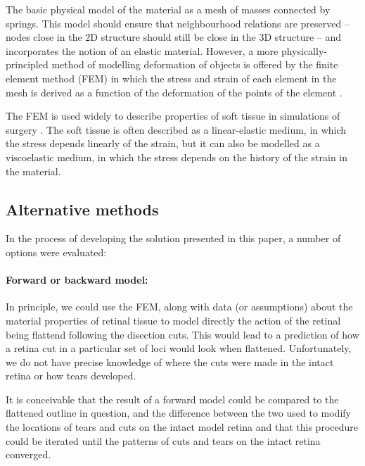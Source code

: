 \documentclass{article}
\begin{document}
The basic physical model of the material as a mesh of masses connected
by springs. This model should ensure that neighbourhood relations are
preserved -- nodes close in the 2D structure should still be close in
the 3D structure -- and incorporates the notion of an elastic
material. However, a more physically-principled method of modelling
deformation of objects is offered by the finite element method (FEM)
in which the stress and strain of each element in the mesh is derived
as a function of the deformation of the points of the element
\citep{ZienTayl00fini}.

The FEM is used widely to describe properties of soft tissue in
simulations of surgery \citep{CartEtal05appl}. The soft tissue is
often described as a linear-elastic medium, in which the stress
depends linearly of the strain, but it can also be modelled as a
viscoelastic medium, in which the stress depends on the history of the
strain in the material. 


\subsection{Alternative methods}
\label{fold-sphere:sec:alternative-methods}

In the process of developing the solution presented in this paper, a
number of options were evaluated:

\paragraph{Forward or backward model:} 

In principle, we could use the FEM, along with data (or assumptions)
about the material properties of retinal tissue to model directly the
action of the retinal being flattend following the disection
cuts. This would lead to a prediction of how a retina cut in a
particular set of loci would look when flattened. Unfortunately, we do
not have precise knowledge of where the cuts were made in the intact
retina or how tears developed.

It is conceivable that the result of a forward model could be compared
to the flattened outline in question, and the difference between the
two used to modify the locations of tears and cuts on the intact model
retina and that this procedure could be iterated until the patterns of
cuts and tears on the intact retina converged.
\end{document}
